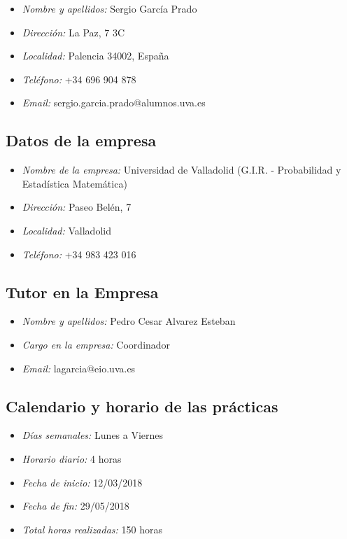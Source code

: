 \documentclass[a4paper,spanish]{article}
\begin{document}
      \begin{itemize}
        \item \emph{Nombre y apellidos:} Sergio García Prado
        \item \emph{Dirección:} La Paz, 7 3C
        \item \emph{Localidad:} Palencia 34002, España
        \item \emph{Teléfono:} +34 696 904 878
        \item \emph{Email:} sergio.garcia.prado@alumnos.uva.es
      \end{itemize}


    \subsection{Datos de la empresa}

      \begin{itemize}
        \item \emph{Nombre de la empresa:} Universidad de Valladolid (G.I.R. - Probabilidad y Estadística Matemática)
        \item \emph{Dirección:} Paseo Belén, 7
        \item \emph{Localidad:} Valladolid
        \item \emph{Teléfono:} +34 983 423 016
      \end{itemize}


    \subsection{Tutor en la Empresa}

      \begin{itemize}
        \item \emph{Nombre y apellidos:} Pedro Cesar Alvarez Esteban
        \item \emph{Cargo en la empresa:} Coordinador
        \item \emph{Email:} lagarcia@eio.uva.es
      \end{itemize}


    \subsection{Calendario y horario de las prácticas}

      \begin{itemize}
        \item \emph{Días semanales:} Lunes a Viernes
        \item \emph{Horario diario:} 4 horas
        \item \emph{Fecha de inicio:} 12/03/2018
        \item \emph{Fecha de fin:} 29/05/2018
        \item \emph{Total horas realizadas:} 150 horas
      \end{itemize}
\end{document}
